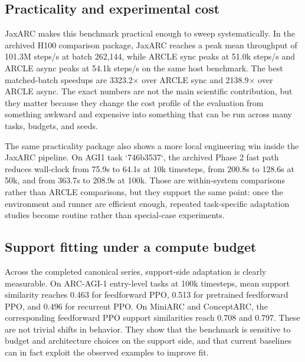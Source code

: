 %
%
%

\subsection{Practicality and experimental cost}

JaxARC makes this benchmark practical enough to sweep systematically. In the archived H100 comparison package, JaxARC reaches a peak mean throughput of 101.3M steps/s at batch 262{,}144, while ARCLE sync peaks at 51.0k steps/s and ARCLE async peaks at 54.1k steps/s on the same host benchmark. The best matched-batch speedups are 3323.2$\times$ over ARCLE sync and 2138.9$\times$ over ARCLE async. The exact numbers are not the main scientific contribution, but they matter because they change the cost profile of the evaluation from something awkward and expensive into something that can be run across many tasks, budgets, and seeds.

The same practicality package also shows a more local engineering win inside the JaxARC pipeline. On AGI1 task `746b3537`, the archived Phase 2 fast path reduces wall-clock from 75.9s to 64.1s at 10k timesteps, from 200.8s to 128.6s at 50k, and from 363.7s to 208.9s at 100k. Those are within-system comparisons rather than ARCLE comparisons, but they support the same point: once the environment and runner are efficient enough, repeated task-specific adaptation studies become routine rather than special-case experiments.

\subsection{Support fitting under a compute budget}

Across the completed canonical series, support-side adaptation is clearly measurable. On ARC-AGI-1 entry-level tasks at 100k timesteps, mean support similarity reaches 0.463 for feedforward PPO, 0.513 for pretrained feedforward PPO, and 0.496 for recurrent PPO. On MiniARC and ConceptARC, the corresponding feedforward PPO support similarities reach 0.708 and 0.797. These are not trivial shifts in behavior. They show that the benchmark is sensitive to budget and architecture choices on the support side, and that current baselines can in fact exploit the observed examples to improve fit.

